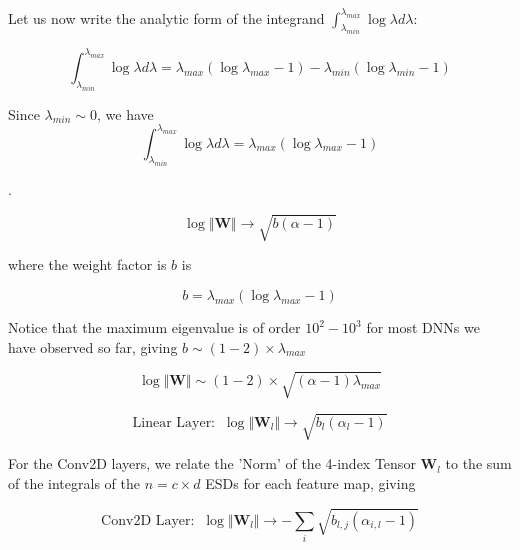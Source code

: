 Let us now write the analytic form of the integrand $\int_{\lambda_{min}}^{\lambda_{max}}\log\lambda d\lambda$:

$$\int_{\lambda_{min}}^{\lambda_{max}}\log\lambda d\lambda=\lambda_{max}(\log \lambda_{max} - 1)-\lambda_{min}(\log \lambda_{min} - 1)$$

Since $\lambda_{min}\sim 0$, we have
$$\int_{\lambda_{min}}^{\lambda_{max}}\log\lambda d\lambda=\lambda_{max}(\log \lambda_{max} - 1)$$






.  

$$\log\Vert\mathbf{W}\Vert\rightarrow \sqrt{b(\alpha-1)}$$

where the weight factor is $b$ is 

$$b=\lambda_{max}(\log \lambda_{max} - 1)$$

Notice that the maximum eigenvalue is of order $10^{2}-10^{3}$ for  most DNNs we have observed so far, giving $b\sim(1-2)\times\lambda_{max}$

$$\log\Vert\mathbf{W}\Vert\sim(1-2)\times\sqrt{(\alpha-1)\lambda_{max}}$$



$$\text{Linear Layer:}\;\;\log\Vert\mathbf{W}_{l}\Vert\rightarrow\sqrt{b_{l}(\alpha_{l}-1)}$$

For the Conv2D layers, we relate the 'Norm' of the 4-index Tensor $\mathbf{W}_{l}$ to the sum of the integrals of the $n=c\times d$ ESDs for each feature map, giving 

$$\text{Conv2D Layer:}\;\;\log\Vert\mathbf{W}_{l}\Vert\rightarrow-\sum_{i}\sqrt{b_{l,j}(\alpha_{i,l}-1)}$$

